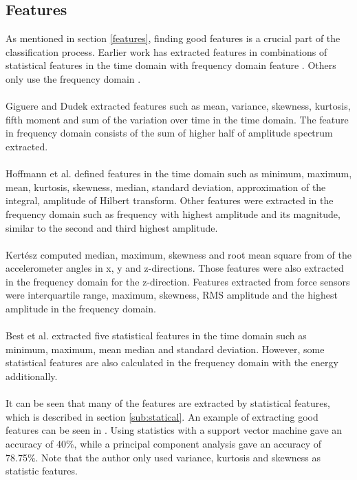\documentclass[USenglish]{ifimaster}  %
\begin{document}
\subsection{Features} \label{sub:relatedfeatures}
As mentioned in section \ref{features}, finding good features is a crucial part of the classification process. Earlier work has extracted features in combinations of statistical features in the time domain with frequency domain feature \cite{5152662,Giguere2009,5509309}. Others only use the frequency domain \cite{4543710} \cite{5979766}.
\\
\\
Giguere and Dudek \cite{5152662} extracted features such as mean, variance, skewness, kurtosis, fifth moment and sum of the variation over time in the time domain. The feature in frequency domain consists of the sum of higher half of amplitude spectrum extracted.
\\
\\
Hoffmann et al. \cite{Hoffmann20141790} defined features in the time domain such as minimum, maximum, mean, kurtosis, skewness, median, standard deviation, approximation of the integral, amplitude of Hilbert transform. Other features were extracted in the frequency domain such as frequency with highest amplitude and its magnitude, similar to the second and third highest amplitude. 
\\
\\
Kertész \cite{7387710} computed median, maximum, skewness and root mean square from of the accelerometer angles in x, y and z-directions. Those features were also extracted in the frequency domain for the z-direction. Features extracted from force sensors were interquartile range, maximum, skewness, RMS amplitude and the highest amplitude in the frequency domain.
\\
\\
Best et al.\cite{26b23e912c654fe4b7478fd910130195} extracted five statistical features in the time domain such as minimum, maximum, mean median and standard deviation. However, some statistical features are also calculated in the frequency domain with the energy additionally.
\\
\\
It can be seen that many of the features are extracted by statistical features, which is described in section \ref{sub:statical}. An example of extracting good features can be seen in \cite{5602459}. Using statistics with a support vector machine gave an accuracy of 40\%, while a principal component analysis gave an accuracy of 78.75\%. Note that the author only used variance, kurtosis and skewness as statistic features.
	
\end{document}
